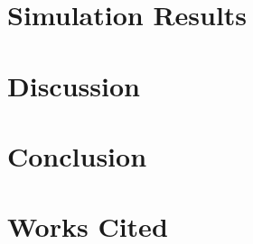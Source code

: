 \documentclass{article}
\begin{document}
\section{Simulation Results}

\section{Discussion}

\section{Conclusion}

\section{Works Cited}
\printbibliography
\end{document}
